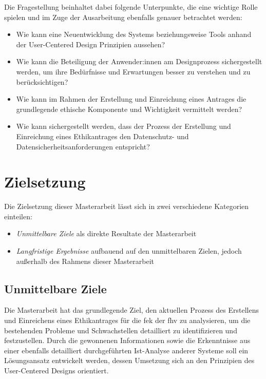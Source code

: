 \documentclass[a4paper,12pt,twoside]{scrreprt}
\begin{document}
\medskip

Die Fragestellung beinhaltet dabei folgende Unterpunkte, die eine wichtige Rolle spielen und im Zuge der Ausarbeitung ebenfalls genauer betrachtet werden:
\begin{itemize}
      \item Wie kann eine Neuentwicklung des Systems beziehungsweise Tools  anhand der User-Centered Design Prinzipien aussehen?
    \item Wie kann die Beteiligung der Anwender:innen am Designprozess sichergestellt werden, um ihre Bedürfnisse und Erwartungen besser zu verstehen und zu berücksichtigen?
    \item Wie kann im Rahmen der Erstellung und Einreichung eines Antrages die grundlegende ethische Komponente und Wichtigkeit vermittelt werden?
    \item Wie kann sichergestellt werden, dass der Prozess der Erstellung und Einreichung eines Ethikantrages den Datenschutz- und Datensicherheitsanforderungen entspricht?
\end{itemize}

\section{Zielsetzung}
\label{sec:zielsetzung}

Die Zielsetzung dieser Masterarbeit lässt sich in zwei verschiedene Kategorien einteilen:
\begin{itemize}
    \item \textit{Unmittelbare Ziele} als direkte Resultate der Masterarbeit
    \item \textit{Langfristige Ergebnisse} aufbauend auf den unmittelbaren Zielen, jedoch außerhalb des Rahmens dieser Masterarbeit
\end{itemize}

\subsection{Unmittelbare Ziele}
\label{sub-sec:unmittelbare-ziele}

Die Masterarbeit hat das grundlegende Ziel, den aktuellen Prozess des Erstellens und Einreichens eines Ethikantrages für die \acl{fek} der \acl{fhv} zu analysieren, um die bestehenden Probleme und Schwachstellen detailliert zu identifizieren und festzustellen. Durch die gewonnenen Informationen sowie die Erkenntnisse aus einer ebenfalls detailliert durchgeführten Ist-Analyse anderer Systeme soll ein Lösungsansatz entwickelt werden, dessen Umsetzung sich an den Prinzipien des User-Centered Designs orientiert.
\end{document}
